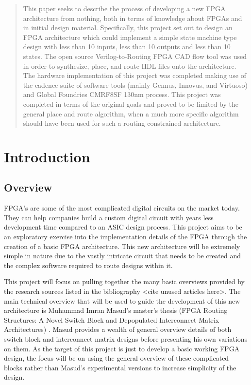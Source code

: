 \documentclass[12pt]{article}
\begin{document}
\begin{abstract}
This paper seeks to describe the process of developing a new FPGA architecture from 
nothing, both in terms of knowledge about FPGAs and in initial design material. Specifically,
 this project set out to design an FPGA architecture which could implement a simple 
state machine type design with less than 10 inputs, less than 10 outputs and less 
than 10 states. The open source Verilog-to-Routing FPGA CAD flow tool was used in order to
synthesize, place, and route HDL files onto the architecture. The hardware implementation of this project was completed
making use of the cadence suite of software tools (mainly Gennus, Innovus, and Virtuoso)
and Global Foundries CMRF8SF 130nm process.
This project was completed in terms of the original goals and proved to be limited by
the general place and route algorithm, when a much more specific algorithm should have been
used for such a routing constrained architecture.

\end{abstract}
\newpage

\tableofcontents
\newpage
\listoffigures
\newpage
\lstlistoflistings
\newpage

\section{Introduction}

\subsection{Overview}

FPGA’s are some of the most complicated digital circuits on the market today. They 
can help companies build a custom digital circuit with years less development time 
compared to an ASIC design process. This project aims to be an exploratory exercise
into the implementation details of the FPGA through the creation 
of a basic FPGA architecture. This new architecture will be extremely simple in nature 
due to the vastly intricate circuit that needs to be created and the complex software 
required to route designs within it.

This project will focus on pulling together the many basic overviews provided by 
the research sources listed in the bibliography <cite unused articles here>. The main technical overview that will 
be used to guide the development of this new architecture is Muhammad Imran Masud’s
master's thesis (FPGA Routing Structures: A Novel Switch Block and Depopulated 
Interconnect Matrix Architectures) \cite{masud_1999}. Masud provides a wealth of general overview details 
of both switch block and interconnect matrix designs before presenting his own variations 
on them. As the target of this project is just to develop a basic working FPGA design,
the focus will be on using the general overview of these complicated blocks rather 
than Masud’s experimental versions to increase simplicity of the design.
\end{document}
